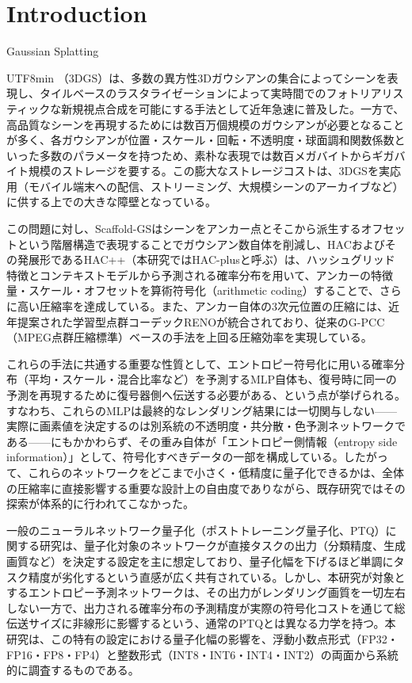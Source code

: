 \documentclass{ieeeaccess}
\begin{document}
\titlepgskip=-15pt

\maketitle

\section{Introduction}
\label{sec:introduction}
 Gaussian Splatting
\begin{CJK}{UTF8}{min}
（3DGS）\cite{kerbl20233d}は、多数の異方性3Dガウシアンの集合によってシーンを表現し、タイルベースのラスタライゼーションによって実時間でのフォトリアリスティックな新規視点合成を可能にする手法として近年急速に普及した。一方で、高品質なシーンを再現するためには数百万個規模のガウシアンが必要となることが多く、各ガウシアンが位置・スケール・回転・不透明度・球面調和関数係数といった多数のパラメータを持つため、素朴な表現では数百メガバイトからギガバイト規模のストレージを要する。この膨大なストレージコストは、3DGSを実応用（モバイル端末への配信、ストリーミング、大規模シーンのアーカイブなど）に供する上での大きな障壁となっている。

この問題に対し、Scaffold-GS\cite{lu2024scaffold}はシーンをアンカー点とそこから派生するオフセットという階層構造で表現することでガウシアン数自体を削減し、HAC\cite{chen2024hac}およびその発展形であるHAC++（本研究ではHAC-plusと呼ぶ）は、ハッシュグリッド特徴とコンテキストモデルから予測される確率分布を用いて、アンカーの特徴量・スケール・オフセットを算術符号化（arithmetic coding）することで、さらに高い圧縮率を達成している。また、アンカー自体の3次元位置の圧縮には、近年提案された学習型点群コーデックRENO\cite{reno}が統合されており、従来のG-PCC（MPEG点群圧縮標準）ベースの手法を上回る圧縮効率を実現している。

これらの手法に共通する重要な性質として、エントロピー符号化に用いる確率分布（平均・スケール・混合比率など）を予測するMLP自体も、復号時に同一の予測を再現するために復号器側へ伝送する必要がある、という点が挙げられる。すなわち、これらのMLPは最終的なレンダリング結果には一切関与しない——実際に画素値を決定するのは別系統の不透明度・共分散・色予測ネットワークである——にもかかわらず、その重み自体が「エントロピー側情報（entropy side information）」として、符号化すべきデータの一部を構成している。したがって、これらのネットワークをどこまで小さく・低精度に量子化できるかは、全体の圧縮率に直接影響する重要な設計上の自由度でありながら、既存研究ではその探索が体系的に行われてこなかった。

一般のニューラルネットワーク量子化（ポストトレーニング量子化、PTQ）に関する研究は、量子化対象のネットワークが直接タスクの出力（分類精度、生成画質など）を決定する設定を主に想定しており、量子化幅を下げるほど単調にタスク精度が劣化するという直感が広く共有されている。しかし、本研究が対象とするエントロピー予測ネットワークは、その出力がレンダリング画質を一切左右しない一方で、出力される確率分布の予測精度が実際の符号化コストを通じて総伝送サイズに非線形に影響するという、通常のPTQとは異なる力学を持つ。本研究は、この特有の設定における量子化幅の影響を、浮動小数点形式（FP32・FP16・FP8・FP4）と整数形式（INT8・INT6・INT4・INT2）の両面から系統的に調査するものである。


\end{CJK}
\end{document}
